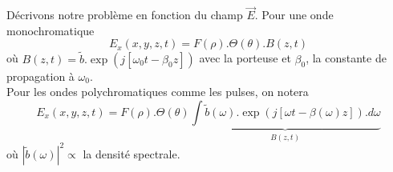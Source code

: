 	Décrivons notre problème en fonction du champ $\vec{E}$. Pour une onde monochromatique
	\begin{equation}
	{E_x}(x,y,z,t) = F(\rho ).\Theta (\theta ).B(z,t)
	\end{equation}
	où $B(z,t) = \tilde b.\exp (j[{\omega _0}t - {\beta _0}z])$ avec la porteuse et $\beta_0$, la 
	constante de propagation à $\omega_0$. \\
	Pour les ondes polychromatiques comme les pulses, on notera
	\begin{equation}
	{E_x}(x,y,z,t) = F(\rho ).\Theta (\theta )\underbrace{\int {\tilde b(\omega ).\exp (j[\omega t - \beta (\omega )z])} .d\omega }_{B(z,t)}
	\end{equation}
	où $|\tilde b(\omega )|^2 \propto$ la densité spectrale. \\
	
